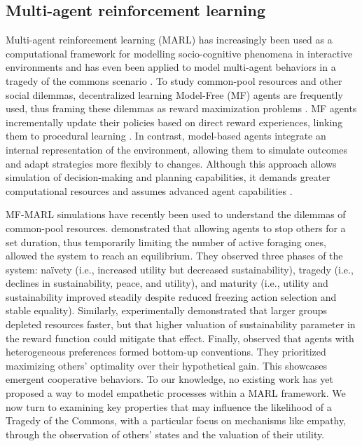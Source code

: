 \subsection{Multi-agent reinforcement learning}
Multi-agent reinforcement learning (MARL) has increasingly been used as a computational framework for modelling socio-cognitive phenomena in interactive environments \cite{gronauerMultiagentDeepReinforcement2022} and has even been applied to model multi-agent behaviors in a tragedy of the commons scenario \cite{perolatMultiagentReinforcementLearning2017}.
 To study common-pool resources and other social dilemmas, decentralized learning Model-Free (MF) agents are frequently used, thus framing these dilemmas as reward maximization problems \cite{perolatMultiagentReinforcementLearning2017,wangEvolvingIntrinsicMotivations2018,zhuDeepMultiagentReinforcement2019}.
 MF agents incrementally update their policies based on direct reward experiences, linking them to procedural learning \cite{kosterModelfreeConventionsMultiagent2020,massiModelbasedModelfreeReplay2022}. In contrast, model-based agents integrate an internal representation of the environment, allowing them to simulate outcomes and adapt strategies more flexibly to changes. Although this approach allows simulation of decision-making and planning capabilities, it demands greater computational resources and assumes advanced agent capabilities \cite{massiModelbasedModelfreeReplay2022}.

MF-MARL simulations have recently been used to understand the dilemmas of common-pool resources. \cite{perolatMultiagentReinforcementLearning2017} demonstrated that allowing agents to stop others for a set duration, thus temporarily limiting the number of active foraging ones, allowed the system to reach an equilibrium. They observed three phases of the system: naïvety (i.e., increased utility but decreased sustainability), tragedy (i.e., declines in sustainability, peace, and utility), and maturity (i.e., utility and sustainability improved steadily despite reduced freezing action selection and stable equality). Similarly, \cite{zhuDeepMultiagentReinforcement2019} experimentally demonstrated that larger groups depleted resources faster, but that higher valuation of sustainability parameter in the reward function could mitigate that effect. Finally, \cite{kosterModelfreeConventionsMultiagent2020} observed that agents with heterogeneous preferences formed bottom-up conventions. They prioritized maximizing others' optimality over their hypothetical gain. This showcases emergent cooperative behaviors. To our knowledge, no existing work has yet proposed a way to model empathetic processes within a MARL framework. We now turn to examining key properties that may influence the likelihood of a Tragedy of the Commons, with a particular focus on mechanisms like empathy, through the observation of others' states and the valuation of their utility.

